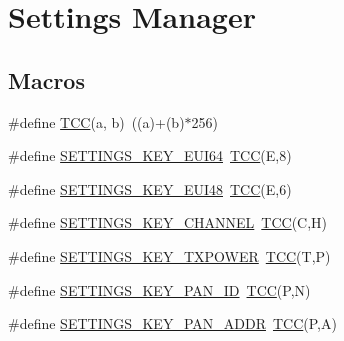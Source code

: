 \hypertarget{group__settings__lib}{}\section{Settings Manager}
\label{group__settings__lib}
\subsection*{Macros}
\begin{DoxyCompactItemize}
\item 
\#define \hyperlink{group__settings__lib_ga407b8baa58a9c300c51b102b71c1f75c}{T\+C\+C}(a,  b)~((a)+(b)$\ast$256)
\item 
\#define \hyperlink{group__settings__lib_ga1c1c56019c03da222e9bc31e12ef572b}{S\+E\+T\+T\+I\+N\+G\+S\+\_\+\+K\+E\+Y\+\_\+\+E\+U\+I64}~\hyperlink{group__settings__lib_ga407b8baa58a9c300c51b102b71c1f75c}{T\+C\+C}(\textquotesingle{}E\textquotesingle{},\textquotesingle{}8\textquotesingle{})
\item 
\#define \hyperlink{group__settings__lib_ga6ddf102943ad20093ef7b3e96669b1bb}{S\+E\+T\+T\+I\+N\+G\+S\+\_\+\+K\+E\+Y\+\_\+\+E\+U\+I48}~\hyperlink{group__settings__lib_ga407b8baa58a9c300c51b102b71c1f75c}{T\+C\+C}(\textquotesingle{}E\textquotesingle{},\textquotesingle{}6\textquotesingle{})
\item 
\#define \hyperlink{group__settings__lib_gabf8742bdf29ef76a3ca68bbcd3382730}{S\+E\+T\+T\+I\+N\+G\+S\+\_\+\+K\+E\+Y\+\_\+\+C\+H\+A\+N\+N\+E\+L}~\hyperlink{group__settings__lib_ga407b8baa58a9c300c51b102b71c1f75c}{T\+C\+C}(\textquotesingle{}C\textquotesingle{},\textquotesingle{}H\textquotesingle{})
\item 
\#define \hyperlink{group__settings__lib_ga64ce6ecd0f8a3717b42717c7583fa17f}{S\+E\+T\+T\+I\+N\+G\+S\+\_\+\+K\+E\+Y\+\_\+\+T\+X\+P\+O\+W\+E\+R}~\hyperlink{group__settings__lib_ga407b8baa58a9c300c51b102b71c1f75c}{T\+C\+C}(\textquotesingle{}T\textquotesingle{},\textquotesingle{}P\textquotesingle{})
\item 
\#define \hyperlink{group__settings__lib_ga760a97bf22844448de082fe8d768c127}{S\+E\+T\+T\+I\+N\+G\+S\+\_\+\+K\+E\+Y\+\_\+\+P\+A\+N\+\_\+\+I\+D}~\hyperlink{group__settings__lib_ga407b8baa58a9c300c51b102b71c1f75c}{T\+C\+C}(\textquotesingle{}P\textquotesingle{},\textquotesingle{}N\textquotesingle{})
\item 
\#define \hyperlink{group__settings__lib_ga76396fc713cb0c3ede4c95e93ac4862e}{S\+E\+T\+T\+I\+N\+G\+S\+\_\+\+K\+E\+Y\+\_\+\+P\+A\+N\+\_\+\+A\+D\+D\+R}~\hyperlink{group__settings__lib_ga407b8baa58a9c300c51b102b71c1f75c}{T\+C\+C}(\textquotesingle{}P\textquotesingle{},\textquotesingle{}A\textquotesingle{})

\end{DoxyCompactItemize}
